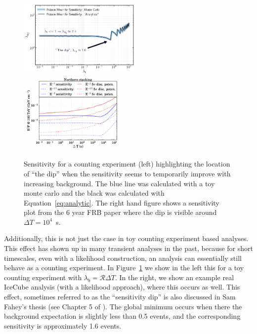 \documentclass[a4paper,11pt]{article}
\begin{document}
\begin{figure}
    \centering
    \includegraphics[width=0.53\textwidth]{figures/sensitivity_the_dip.png}
    \includegraphics[width=0.46\textwidth]{figures/the_dip_icecube_example_frb.png}
    \caption{Sensitivity for a counting experiment (left) highlighting the location of ``the dip'' when the sensitivity seems to temporarily improve with increasing background. The blue line was calculated with a toy monte carlo and the black was calculated with Equation~\ref{eq:analytic}. The right hand figure shows a sensitivity plot from the 6 year FRB paper \cite{IceCube:2017fpg} where the dip is visible around $\Delta T = 10^4$~s.}
    \label{fig:sens_the_dip}
\end{figure}

Additionally, this is not just the case in toy counting experiment based analyses. This effect has shown up in many transient analyses in the past, because for short timescales, even with a likelihood construction, an analysis can essentially still behave as a counting experiment. In Figure~\ref{fig:sens_the_dip} we show in the left this for a toy counting experiment with $\lambda_b = \mathcal{R}\Delta T$. In the right, we show an example real IceCube analysis (with a likelihood approach), where this occurs as well. This effect, sometimes referred to as the ``sensitivity dip'' is also discussed in Sam Fahey's thesis (see Chapter 5 of \cite{samthesis}). The global minimum occurs when there the background expectation is slightly less than 0.5 events, and the corresponding sensitivity is approximately 1.6 events. 
\end{document}
